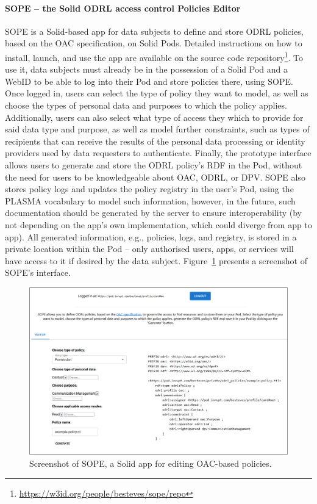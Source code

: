 \paragraph{SOPE -- the Solid ODRL access control Policies Editor}
SOPE is a Solid-based app for data subjects to define and store ODRL policies, based on the OAC specification, on Solid Pods.
Detailed instructions on how to install, launch, and use the app are available on the source code repository\footnote{\url{https://w3id.org/people/besteves/sope/repo}}.
To use it, data subjects must already be in the possession of a Solid Pod and a WebID to be able to log into their Pod and store policies there, using SOPE.
Once logged in, users can select the type of policy they want to model, as well as choose the types of personal data and purposes to which the policy applies.
Additionally, users can also select what type of access they which to provide for said data type and purpose, as well as model further constraints, such as types of recipients that can receive the results of the personal data processing or identity providers used by data requesters to authenticate.
Finally, the prototype interface allows users to generate and store the ODRL policy's RDF in the Pod, without the need for users to be knowledgeable about OAC, ODRL, or DPV.
SOPE also stores policy logs and updates the policy registry in the user's Pod, using the PLASMA vocabulary to model such information, however, in the future, such documentation should be generated by the server to ensure interoperability (by not depending on the app's own implementation, which could diverge from app to app).
All generated information, e.g., policies, logs, and registry, is stored in a private location within the Pod -- only authorised users, apps, or services will have access to it if desired by the data subject.
Figure~\ref{fig:sope-ui} presents a screenshot of SOPE's interface.

\begin{figure}[ht]
    \centering
    \includegraphics[width=0.9\linewidth]{figures//chapter-6/sope-snap.png}
    \caption{Screenshot of SOPE, a Solid app for editing OAC-based policies.}
    \label{fig:sope-ui}
\end{figure}

